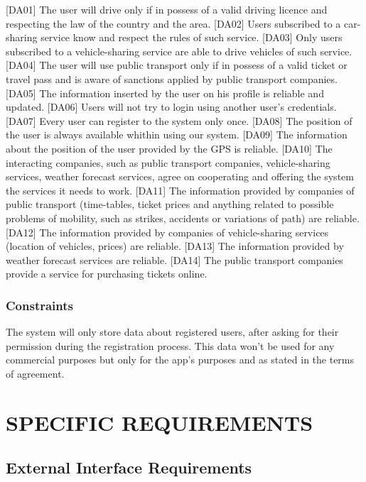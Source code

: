 \documentclass[a4paper,leqno]{book}
\begin{document}
[DA01] The user will drive only if in possess of a valid driving licence and respecting the law of the country and the area.
[DA02] Users subscribed to a car-sharing service know and respect the rules of such service.
[DA03] Only users subscribed to a vehicle-sharing service are able to drive vehicles of such service.
[DA04] The user will use public transport only if in possess of a valid ticket or travel pass and is aware of sanctions applied by public transport companies.
[DA05] The information inserted by the user on his profile is reliable and updated.
[DA06] Users will not try to login using another user's credentials.
[DA07] Every user can register to the system only once.
[DA08] The position of the user is always available whithin using our system.
[DA09] The information about the position of the user provided by the GPS is reliable.
[DA10] The interacting companies, such as public transport companies, vehicle-sharing services, weather forecast services, agree on cooperating and offering the system the services it needs to work.
[DA11] The information provided by companies of public transport (time-tables, ticket prices and anything related to possible problems of mobility, such as strikes, accidents or variations of path) are reliable.
[DA12] The information provided by companies of vehicle-sharing services (location of vehicles, prices) are reliable.
[DA13] The information provided by weather forecast services are reliable.
[DA14] The public transport companies provide a service for purchasing tickets online.

\subsection{Constraints}
The system will only store data about registered users, after asking for their permission during the registration process. This data won't be used for any commercial purposes but only for the app's purposes and as stated in the terms of agreement.

\chapter{SPECIFIC REQUIREMENTS}

\section{External Interface Requirements}
\end{document}
